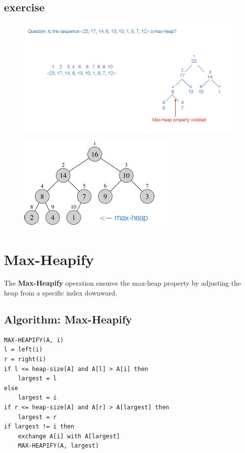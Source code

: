 \subsection{exercise}
\begin{figure}[h!]
    \centering
    \includegraphics[width=1\linewidth]{immagini/heap2.png}
\end{figure}

\begin{figure}[H]
    \centering
\includegraphics[width=0.5\linewidth]{heap prop.png}
    \label{fig:enter-label}
\end{figure}


\section{Max-Heapify}
The \textbf{Max-Heapify} operation ensures the max-heap property by adjusting the heap from a specific index downward.

\subsection{Algorithm: Max-Heapify}
\begin{verbatim}
MAX-HEAPIFY(A, i)
l = left(i)
r = right(i)
if l <= heap-size[A] and A[l] > A[i] then
    largest = l
else
    largest = i
if r <= heap-size[A] and A[r] > A[largest] then
    largest = r
if largest != i then
    exchange A[i] with A[largest]
    MAX-HEAPIFY(A, largest)
\end{verbatim}

